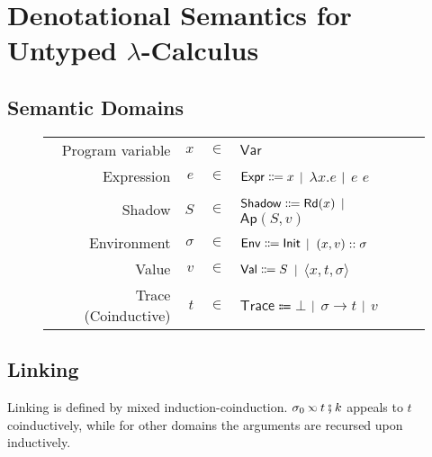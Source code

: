 \section{Denotational Semantics for Untyped $\lambda$-Calculus}

\subsection{Semantic Domains}
\begin{figure}[h]
  \small
  \begin{tabular}{rrcll}
    Program variable    & $x$      & $\in$ & $\textsf{Var}$                                                          \\
    Expression          & $e$      & $\in$ & $\mathsf{Expr}\Coloneqq x$ $|$ $\lambda x.e$ $|$ $e$ $e$                \\
    Shadow              & $S$      & $\in$ & $\mathsf{Shadow}\Coloneqq\textsf{Rd}(x)$ $|$ $\textsf{Ap}(S,v)$              \\
    Environment         & $\sigma$ & $\in$ & $\mathsf{Env}\Coloneqq\textsf{Init}$ $|$ $(x,v)::\sigma$                 \\
    Value               & $v$      & $\in$ & $\mathsf{Val}\Coloneqq S$ $|$ $\langle x,t,\sigma \rangle$                \\
    Trace (Coinductive) & $t$      & $\in$ & $\textsf{Trace}\Coloneqq\bot$ $|$ $\sigma\rightarrow t$ $|$ $v$ \\
  \end{tabular}
\end{figure}

\subsection{Linking}
Linking is defined by mixed induction-coinduction.
$\sigma_0\semlink t\fatsemi k$ appeals to $t$ coinductively, while for other domains the arguments are recursed upon inductively.

